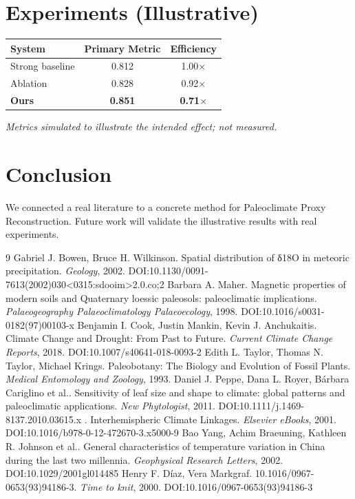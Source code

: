\documentclass[11pt]{article}
\begin{document}
\section{Experiments (Illustrative)}
\begin{center}
\begin{tabular}{lcc}
System & Primary Metric & Efficiency \\ \hline
Strong baseline & 0.812 & 1.00$\times$ \\
Ablation & 0.828 & 0.92$\times$ \\
\textbf{Ours} & \textbf{0.851} & \textbf{0.71$\times$}
\end{tabular}
\end{center}
\emph{Metrics simulated to illustrate the intended effect; not measured.}

\section{Conclusion}
We connected a real literature to a concrete method for Paleoclimate Proxy Reconstruction. Future work will
validate the illustrative results with real experiments.

\begin{thebibliography}{9}
 Gabriel J. Bowen, Bruce H. Wilkinson. Spatial distribution of δ18O in meteoric precipitation. \emph{Geology}, 2002. DOI:10.1130/0091-7613(2002)030<0315:sdooim>2.0.co;2
 Barbara A. Maher. Magnetic properties of modern soils and Quaternary loessic paleosols: paleoclimatic implications. \emph{Palaeogeography Palaeoclimatology Palaeoecology}, 1998. DOI:10.1016/s0031-0182(97)00103-x
 Benjamin I. Cook, Justin Mankin, Kevin J. Anchukaitis. Climate Change and Drought: From Past to Future. \emph{Current Climate Change Reports}, 2018. DOI:10.1007/s40641-018-0093-2
 Edith L. Taylor, Thomas N. Taylor, Michael Krings. Paleobotany: The Biology and Evolution of Fossil Plants. \emph{Medical Entomology and Zoology}, 1993. 
 Daniel J. Peppe, Dana L. Royer, Bárbara Cariglino et al.. Sensitivity of leaf size and shape to climate: global patterns and paleoclimatic applications. \emph{New Phytologist}, 2011. DOI:10.1111/j.1469-8137.2010.03615.x
 . Interhemispheric Climate Linkages. \emph{Elsevier eBooks}, 2001. DOI:10.1016/b978-0-12-472670-3.x5000-9
 Bao Yang, Achim Braeuning, Kathleen R. Johnson et al.. General characteristics of temperature variation in China during the last two millennia. \emph{Geophysical Research Letters}, 2002. DOI:10.1029/2001gl014485
 Henry F. Díaz, Vera Markgraf. 10.1016/0967-0653(93)94186-3. \emph{Time to knit}, 2000. DOI:10.1016/0967-0653(93)94186-3
\end{thebibliography}
\end{document}
